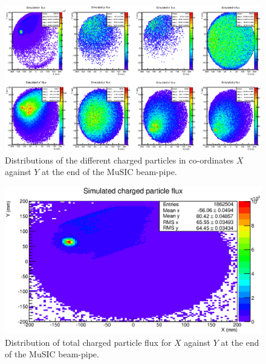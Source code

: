 \begin{figure}
  \centering
    \includegraphics[width=.9\textwidth]{images/sim_2d_per_pid_flux.eps}
  \caption{Distributions of the different charged particles in co-ordinates \(X\) against \(Y\) at the end of the MuSIC beam-pipe.}
  \label{fig:images_sim_2d_per_pid_flux}
\end{figure}

\begin{figure}[hptb]
  \centering
  \includegraphics[width=.9\textwidth]{images/sim_2d_charged_particle_flux.eps}
  \caption{Distribution of total charged particle flux for \(X\) against \(Y\) at the end of the MuSIC beam-pipe.}
  \label{fig:images_sim_2d_charged_particle_flux}
\end{figure}


